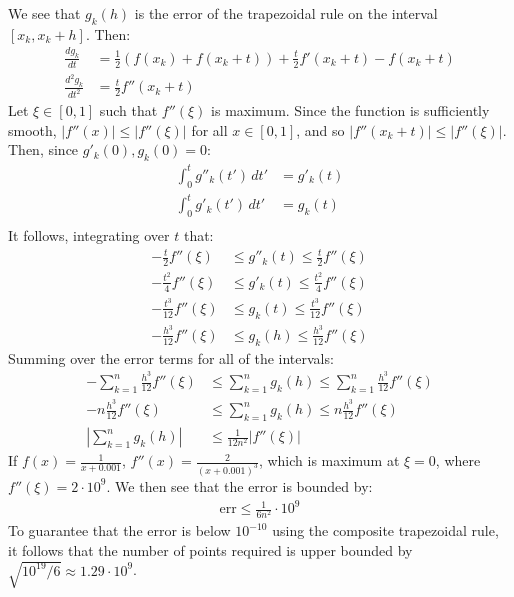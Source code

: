 \documentclass{article}
\begin{document}
We see that $g_k(h)$ is the error of the trapezoidal rule on the interval $[x_k, x_k + h]$. Then:
\begin{align*}
    \frac{dg_k}{dt} & = \frac{1}{2}(f(x_k) + f(x_k + t)) + \frac{t}{2}f'(x_k + t) - f(x_k + t) \\
    \frac{d^2g_k}{dt^2} & = \frac{t}{2}f''(x_k + t)
\end{align*}
Let $\xi \in [0, 1]$ such that $f''(\xi)$ is maximum. Since the function is sufficiently smooth, $|f''(x)| \leq |f''(\xi)|$ for all $x \in [0, 1]$, and so $|f''(x_k + t)| \leq |f''(\xi)|$. Then, since $g'_k(0), g_k(0) = 0$:
\begin{align*}
    \int_0^t g''_k(t') \, dt' & = g'_k(t) \\
    \int_0^t g'_k(t') \, dt' & = g_k(t) \\
\end{align*}
It follows, integrating over $t$ that:
\begin{align*}
    -\frac{t}{2}f''(\xi) & \leq g''_k(t) \leq \frac{t}{2}f''(\xi) \\
    -\frac{t^2}{4}f''(\xi) & \leq g'_k(t) \leq \frac{t^2}{4}f''(\xi) \\
    -\frac{t^3}{12}f''(\xi) & \leq g_k(t) \leq \frac{t^3}{12}f''(\xi) \\
    -\frac{h^3}{12}f''(\xi) & \leq g_k(h) \leq \frac{h^3}{12}f''(\xi)
\end{align*}
Summing over the error terms for all of the intervals:
\begin{align*}
    -\sum_{k=1}^n \frac{h^3}{12}f''(\xi) & \leq \sum_{k=1}^n g_k(h) \leq \sum_{k=1}^n \frac{h^3}{12}f''(\xi) \\
    -n\frac{h^3}{12}f''(\xi) & \leq \sum_{k=1}^n g_k(h) \leq n\frac{h^3}{12}f''(\xi) \\
    \left|\sum_{k=1}^n g_k(h)\right| & \leq \frac{1}{12n^2}|f''(\xi)|
\end{align*}
If $f(x) = \frac{1}{x + 0.001}$, $f''(x) = \frac{2}{(x + 0.001)^3}$, which is maximum at $\xi = 0$, where $f''(\xi) = 2 \cdot 10^9$. We then see that the error is bounded by:
\begin{align*}
    \textrm{err} \leq \frac{1}{6n^2} \cdot 10^9
\end{align*}
To guarantee that the error is below $10^{-10}$ using the composite trapezoidal rule, it follows that the number of points required is upper bounded by $\sqrt{10^{19}/6} \approx 1.29 \cdot 10^9$.
\end{document}
